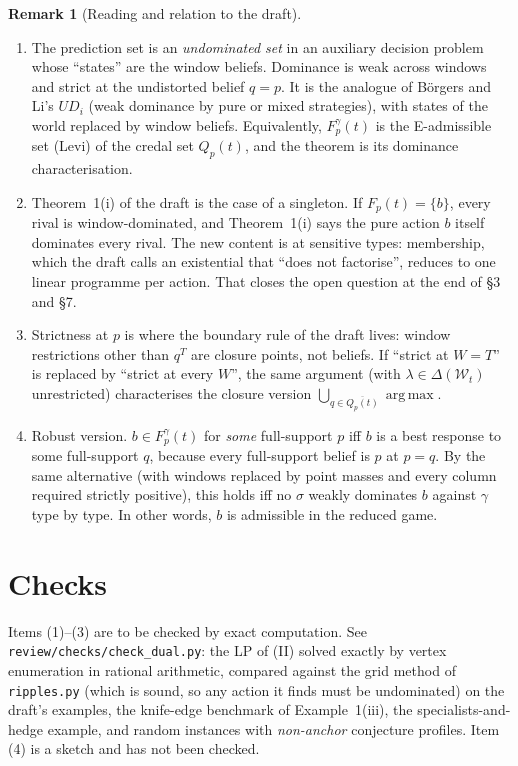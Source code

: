 \documentclass[11pt]{article}
\theoremstyle{definition}
\newtheorem{remark}{Remark}
\DeclareMathOperator*{\argmax}{arg\,max}
\begin{document}
\begin{remark}[Reading and relation to the draft]
\begin{enumerate}
\item The prediction set is an \emph{undominated set} in an auxiliary decision problem
  whose ``states'' are the window beliefs. Dominance is weak across windows and strict
  at the undistorted belief $q = p$. It is the analogue of B\"orgers and Li's
  $UD_i$ (weak dominance by pure or mixed strategies), with states of the world
  replaced by window beliefs. Equivalently, $F^\gamma_p(t)$ is the E-admissible set
  (Levi) of the credal set $Q_p(t)$, and the theorem is its dominance
  characterisation.
\item Theorem~1(i) of the draft is the case of a singleton. If $F_p(t) = \{b\}$, every
  rival is window-dominated, and Theorem~1(i) says the pure action $b$ itself
  dominates every rival. The new content is at sensitive types: membership, which
  the draft calls an existential that ``does not factorise'', reduces to one linear
  programme per action. That closes the open question at the end of \S3 and \S7.
\item Strictness at $p$ is where the boundary rule of the draft lives: window
  restrictions other than $q^T$ are closure points, not beliefs. If ``strict at
  $W = T$'' is replaced by ``strict at every $W$'', the same argument (with
  $\lambda \in \Delta(\mathcal W_t)$ unrestricted) characterises the closure
  version $\bigcup_{q \in \overline{Q_p(t)}} \argmax$.
\item Robust version. $b \in F^\gamma_p(t)$ for \emph{some} full-support $p$ iff $b$
  is a best response to some full-support $q$, because every full-support belief is
  $p$ at $p = q$. By the same alternative (with windows replaced by point masses
  and every column required strictly positive), this holds iff no $\sigma$
  weakly dominates $b$ against $\gamma$ type by type. In other words, $b$ is
  admissible in the reduced game.
\end{enumerate}
\end{remark}

\section*{Checks}

Items (1)--(3) are to be checked by exact computation. See
\texttt{review/checks/check\_dual.py}: the LP of (II) solved exactly by vertex
enumeration in rational arithmetic, compared against the grid method of
\texttt{ripples.py} (which is sound, so any action it finds must be undominated) on
the draft's examples, the knife-edge benchmark of Example~1(iii), the specialists-and-hedge
example, and random instances with \emph{non-anchor} conjecture profiles.
Item (4) is a sketch and has not been checked.
\end{document}
